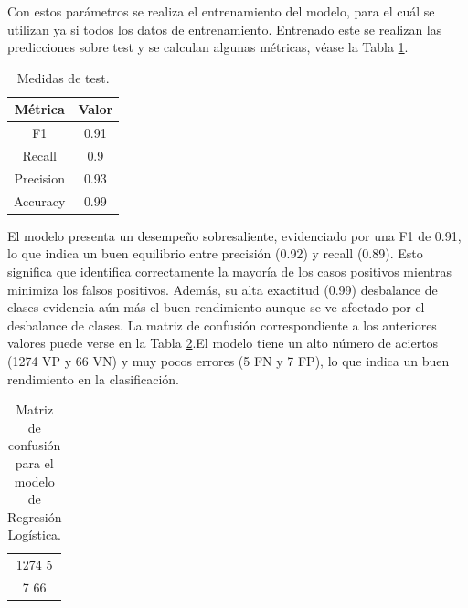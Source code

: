 \documentclass[12pt,letterpaper]{article}
\begin{document}
Con estos parámetros se realiza el entrenamiento del modelo, para el cuál se utilizan ya si todos los datos de entrenamiento. Entrenado este se realizan las predicciones sobre test y se calculan algunas métricas, véase la Tabla \ref{tab:evaluacion_logistic}.

\begin{table}[H]
    \centering
    \begin{tabular}{|c|c|}
    \hline
    Métrica & Valor  \\ \hline \hline
    F1 & 0.91 \\ \hline
    Recall & 0.9 \\ \hline
    Precision & 0.93 \\ \hline
    Accuracy & 0.99 \\ \hline
    \end{tabular}
    \caption{Medidas de test.}
    \label{tab:evaluacion_logistic}
\end{table}

El modelo presenta un desempeño sobresaliente, evidenciado por una F1 de 0.91, lo que indica un buen equilibrio entre precisión (0.92) y recall (0.89). Esto significa que identifica correctamente la mayoría de los casos positivos mientras minimiza los falsos positivos. Además, su alta exactitud (0.99) desbalance de clases evidencia aún más el buen rendimiento aunque se ve afectado por el desbalance de clases. La matriz de confusión correspondiente a los anteriores valores puede verse en la Tabla \ref{tab:confusion-LR}.El modelo tiene un alto número de aciertos (1274 VP y 66 VN) y muy pocos errores (5 FN y 7 FP), lo que indica un buen rendimiento en la clasificación.


\begin{table}[H]
    \centering
    \begin{tabular}{|c|}
    \hline
    1274 \hspace{8mm} 5 \\ 
    7 \hspace{10mm} 66 \\ \hline
    \end{tabular}
    \caption{Matriz de confusión para el modelo de Regresión Logística.}
    \label{tab:confusion-LR}
\end{table}
\end{document}

